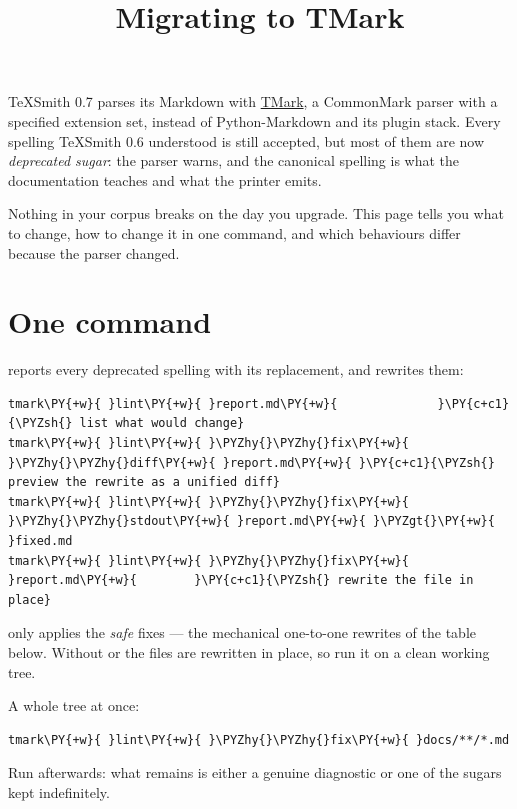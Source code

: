 \documentclass[a4paper,twoside]{article}
\title{Migrating to TMark}
\author{}\date{}
\begin{document}
\maketitle
TeXSmith 0.7 parses its Markdown with \href{https://github.com/yves-chevallier/tmark}{TMark},
a CommonMark parser with a specified extension set, instead of Python-Markdown
and its plugin stack. Every spelling TeXSmith 0.6 understood is still accepted,
but most of them are now \emph{deprecated sugar}: the parser warns, and the
canonical spelling is what the documentation teaches and what the printer
emits.

Nothing in your corpus breaks on the day you upgrade. This page tells you what
to change, how to change it in one command, and which behaviours differ because
the parser changed.
\section{One command}
 reports every deprecated spelling with its replacement, and
 rewrites them:
\begin{tscode}[lang=bash, engine=pygments]
\begin{Verbatim}[commandchars=\\\{\},breaklines, breakanywhere, commandchars=\\\{\}]
tmark\PY{+w}{ }lint\PY{+w}{ }report.md\PY{+w}{              }\PY{c+c1}{\PYZsh{} list what would change}
tmark\PY{+w}{ }lint\PY{+w}{ }\PYZhy{}\PYZhy{}fix\PY{+w}{ }\PYZhy{}\PYZhy{}diff\PY{+w}{ }report.md\PY{+w}{ }\PY{c+c1}{\PYZsh{} preview the rewrite as a unified diff}
tmark\PY{+w}{ }lint\PY{+w}{ }\PYZhy{}\PYZhy{}fix\PY{+w}{ }\PYZhy{}\PYZhy{}stdout\PY{+w}{ }report.md\PY{+w}{ }\PYZgt{}\PY{+w}{ }fixed.md
tmark\PY{+w}{ }lint\PY{+w}{ }\PYZhy{}\PYZhy{}fix\PY{+w}{ }report.md\PY{+w}{        }\PY{c+c1}{\PYZsh{} rewrite the file in place}
\end{Verbatim}
\end{tscode}
 only applies the \emph{safe} fixes --- the mechanical one-to-one rewrites of
the table below. Without  or  the files are rewritten in
place, so run it on a clean working tree.

A whole tree at once:
\begin{tscode}[lang=bash, engine=pygments]
\begin{Verbatim}[commandchars=\\\{\},breaklines, breakanywhere, commandchars=\\\{\}]
tmark\PY{+w}{ }lint\PY{+w}{ }\PYZhy{}\PYZhy{}fix\PY{+w}{ }docs/**/*.md
\end{Verbatim}
\end{tscode}
Run  afterwards: what remains is either a genuine
diagnostic or one of the sugars kept indefinitely.
\end{document}
